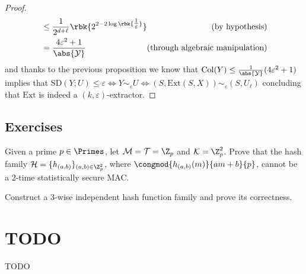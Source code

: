 \documentclass[a4paper, 12pt]{report}
\begin{document}
\begin{proof}
\begin{equation*}
\begin{alignedat}{2}
			              & \le \dfrac{1}{2^{d + \ell}}\rbk{2^{2 - 2 \log \rbk{\tfrac{1}{\varepsilon}}}} & \quad (\mbox{by hypothesis})            \\
			              & = \dfrac{4\varepsilon^2 +1}{\abs{\mathcal Y}}                                & (\mbox{through algebraic manipulation}) \\
		\end{alignedat}
	\end{equation*}
	and thanks to the previous proposition we know that $\mbox{Col}(Y) \le \tfrac{1}{\abs{\mathcal Y}}(4\varepsilon^2 + 1)$ implies that $\mbox{SD}(Y;U) \le \varepsilon \iff Y \sim_\varepsilon U \iff (S, \mbox{Ext}(S, X)) \sim_\varepsilon (S, U_\ell)$ concluding that $\mbox{Ext}$ is indeed a $(k, \varepsilon)$-extractor.
\end{proof}

\section{Exercises}

\begin{framedprob}{}
	Given a prime $p \in \Primes$, let $\mathcal M = \mathcal T = \Z_p$ and $\mathcal K = \Z_p^2$. Prove that the hash family $\mathcal H = \{h_{(a, b)}\}_{(a, b) \in \Z_p^2}$, where $\congmod{h_{(a, b)}(m)}{am + b}{p}$, cannot be a 2-time statistically secure MAC.
\end{framedprob}


\begin{framedprob}{}
	Construct a 3-wise independent hash function family and prove its correctness.
\end{framedprob}


\chapter{TODO}

TODO 

\end{document}

